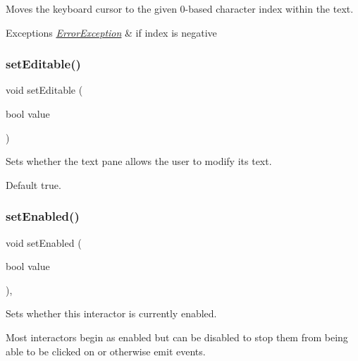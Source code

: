 Moves the keyboard cursor to the given 0-\/based character index within the text. 


\begin{DoxyExceptions}{Exceptions}
{\em \mbox{\hyperlink{classErrorException}{Error\+Exception}}} & if index is negative \\
\hline
\end{DoxyExceptions}
\mbox{\label{classGBrowserPane_a008d7fd44fb3e7a6886cdaddbc3644a2}} 
\subsubsection{\texorpdfstring{set\+Editable()}{setEditable()}}
{\footnotesize\ttfamily void set\+Editable (\begin{DoxyParamCaption}\item[{bool}]{value }\end{DoxyParamCaption})\hspace{0.3cm}{\ttfamily [virtual]}}



Sets whether the text pane allows the user to modify its text. 

Default true. \mbox{\label{classGInteractor_ab831367dd84bbd579e02e55bacb21343}} 
\subsubsection{\texorpdfstring{set\+Enabled()}{setEnabled()}}
{\footnotesize\ttfamily void set\+Enabled (\begin{DoxyParamCaption}\item[{bool}]{value }\end{DoxyParamCaption})\hspace{0.3cm}{\ttfamily [virtual]}, {\ttfamily [inherited]}}



Sets whether this interactor is currently enabled. 

Most interactors begin as enabled but can be disabled to stop them from being able to be clicked on or otherwise emit events. \mbox{\label{classGObservable_ad2f6d34961c50f6c1e0659990b79f741}} 
